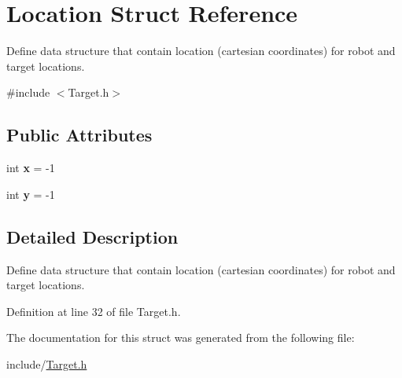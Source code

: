 \hypertarget{struct_location}{}\section{Location Struct Reference}
\label{struct_location}


Define data structure that contain location (cartesian coordinates) for robot and target locations.  




{\ttfamily \#include $<$Target.\+h$>$}

\subsection*{Public Attributes}
\begin{DoxyCompactItemize}
\item 
\mbox{\label{struct_location_aea76eebc474e30c04c53e5f03c6749e3}} 
int {\bfseries x} = -\/1
\item 
\mbox{\label{struct_location_a307809776b981810147af56d9304e273}} 
int {\bfseries y} = -\/1
\end{DoxyCompactItemize}


\subsection{Detailed Description}
Define data structure that contain location (cartesian coordinates) for robot and target locations. 

Definition at line 32 of file Target.\+h.



The documentation for this struct was generated from the following file\+:\begin{DoxyCompactItemize}
\item 
include/\mbox{\hyperlink{_target_8h}{Target.\+h}}\end{DoxyCompactItemize}
